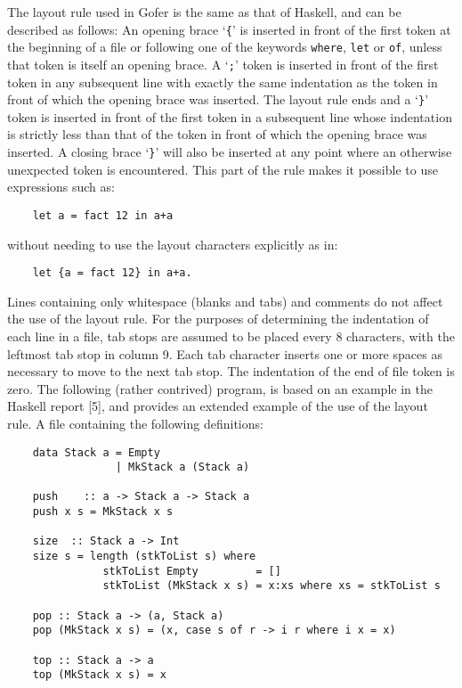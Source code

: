 The layout rule used in Gofer is the same as that of Haskell,  and  can
be described as follows:
\BI
\IT  An opening brace `\verb"{"' is inserted in front of the  first  token  at
     the beginning of a file or following one of the keywords  \verb"where",
     \verb"let" or \verb"of", unless that token is itself an opening brace.
\IT  A `\verb";"' token is inserted in front of the first token in any subsequent
     line with exactly the same indentation as the token  in  front  of
     which the opening brace was inserted.
\IT  The layout rule ends and a `\verb"}"' token is inserted in front  of  the
     first token in a subsequent line  whose  indentation  is  strictly
     less than that of the token in front of which  the  opening  brace
     was inserted.
\IT  A closing brace `\verb"}"' will also be inserted at any  point  where  an
     otherwise unexpected token is encountered.  This part of the rule
     makes it possible to use expressions such as:
\begin{verbatim}
    let a = fact 12 in a+a
\end{verbatim}
     without needing to use the layout characters explicitly as in:
\begin{verbatim}
    let {a = fact 12} in a+a.
\end{verbatim}
\IT  Lines containing only whitespace (blanks and tabs) and comments do
     not affect the use of the layout rule.
\IT  For the purposes of determining the indentation of each line in  a
     file, tab stops are assumed to be placed every 8 characters,  with
     the leftmost tab stop in column 9.  Each tab character inserts one
     or more spaces as necessary to move to the next tab stop.
\IT  The indentation of the end of file token is zero.
\EI
The following (rather contrived) program, is based on an example in the
Haskell report [5], and provides an extended example of the use of  the
layout rule.  A file containing the following definitions:
\begin{verbatim}
    data Stack a = Empty
                 | MkStack a (Stack a)

    push    :: a -> Stack a -> Stack a
    push x s = MkStack x s

    size  :: Stack a -> Int
    size s = length (stkToList s) where
               stkToList Empty         = []
               stkToList (MkStack x s) = x:xs where xs = stkToList s

    pop :: Stack a -> (a, Stack a)
    pop (MkStack x s) = (x, case s of r -> i r where i x = x)

    top :: Stack a -> a
    top (MkStack x s) = x
\end{verbatim}
